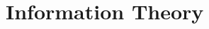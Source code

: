 \chapter{Information Theory}
\label{cha:InformationTheory}

\begin{multicols}{2}
\setlength{\columnseprule}{0.2pt}  








\end{multicols}

